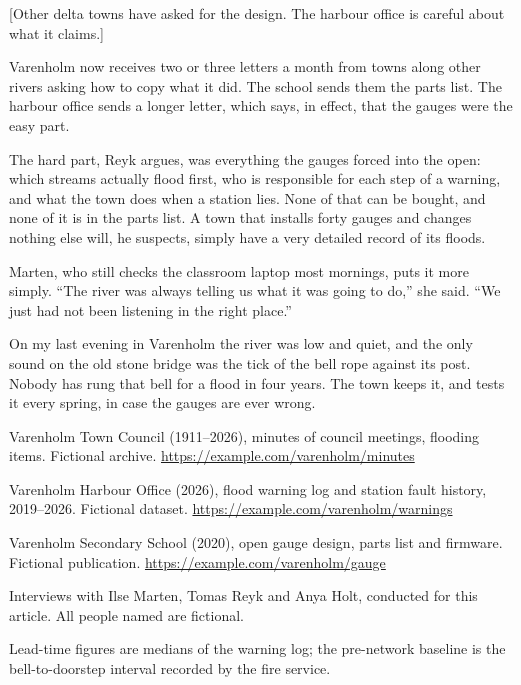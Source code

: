 \documentclass[theme=editorial,publication-type=feature-article]{reportkit}
\begin{document}
[Other delta towns have asked for the design. The harbour office is careful about what it claims.]

Varenholm now receives two or three letters a month from towns along other rivers asking how to copy what it did. The school sends them the parts list. The harbour office sends a longer letter, which says, in effect, that the gauges were the easy part.

The hard part, Reyk argues, was everything the gauges forced into the open: which streams actually flood first, who is responsible for each step of a warning, and what the town does when a station lies. None of that can be bought, and none of it is in the parts list. A town that installs forty gauges and changes nothing else will, he suspects, simply have a very detailed record of its floods.

Marten, who still checks the classroom laptop most mornings, puts it more simply. “The river was always telling us what it was going to do,” she said. “We just had not been listening in the right place.”

On my last evening in Varenholm the river was low and quiet, and the only sound on the old stone bridge was the tick of the bell rope against its post. Nobody has rung that bell for a flood in four years. The town keeps it, and tests it every spring, in case the gauges are ever wrong.

\begin{featurereferences}
\item Varenholm Town Council (1911--2026), minutes of council meetings, flooding items. Fictional archive. \url{https://example.com/varenholm/minutes}
\item Varenholm Harbour Office (2026), flood warning log and station fault history, 2019--2026. Fictional dataset. \url{https://example.com/varenholm/warnings}
\item Varenholm Secondary School (2020), open gauge design, parts list and firmware. Fictional publication. \url{https://example.com/varenholm/gauge}
\item Interviews with Ilse Marten, Tomas Reyk and Anya Holt, conducted for this article. All people named are fictional.
\item Lead-time figures are medians of the warning log; the pre-network baseline is the bell-to-doorstep interval recorded by the fire service.
\end{featurereferences}
\end{document}
